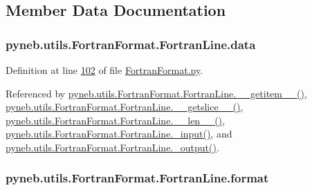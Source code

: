 \subsection{Member Data Documentation}
\hypertarget{classpyneb_1_1utils_1_1_fortran_format_1_1_fortran_line_a5976b8e1d4375a2ea62b9359bcf84697}{
\subsubsection[{data}]{\setlength{\rightskip}{0pt plus 5cm}pyneb.\-utils.\-Fortran\-Format.\-Fortran\-Line.\-data}}\label{classpyneb_1_1utils_1_1_fortran_format_1_1_fortran_line_a5976b8e1d4375a2ea62b9359bcf84697}


Definition at line \hyperlink{_fortran_format_8py_source_l00102}{102} of file \hyperlink{_fortran_format_8py_source}{Fortran\-Format.\-py}.



Referenced by \hyperlink{_fortran_format_8py_source_l00123}{pyneb.\-utils.\-Fortran\-Format.\-Fortran\-Line.\-\_\-\-\_\-getitem\-\_\-\-\_\-()}, \hyperlink{_fortran_format_8py_source_l00131}{pyneb.\-utils.\-Fortran\-Format.\-Fortran\-Line.\-\_\-\-\_\-getslice\-\_\-\-\_\-()}, \hyperlink{_fortran_format_8py_source_l00116}{pyneb.\-utils.\-Fortran\-Format.\-Fortran\-Line.\-\_\-\-\_\-len\-\_\-\-\_\-()}, \hyperlink{_fortran_format_8py_source_l00155}{pyneb.\-utils.\-Fortran\-Format.\-Fortran\-Line.\-\_\-input()}, and \hyperlink{_fortran_format_8py_source_l00195}{pyneb.\-utils.\-Fortran\-Format.\-Fortran\-Line.\-\_\-output()}.

\hypertarget{classpyneb_1_1utils_1_1_fortran_format_1_1_fortran_line_ae97c8744bdb9817ec8a9c58b7a6bfe20}{
\subsubsection[{format}]{\setlength{\rightskip}{0pt plus 5cm}pyneb.\-utils.\-Fortran\-Format.\-Fortran\-Line.\-format}}\label{classpyneb_1_1utils_1_1_fortran_format_1_1_fortran_line_ae97c8744bdb9817ec8a9c58b7a6bfe20}


